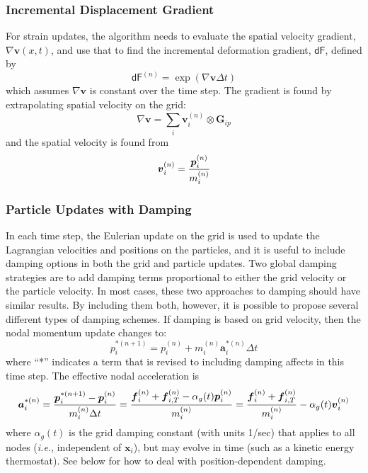 \documentclass[11pt]{article}
\renewcommand{\vec}[1]{\boldsymbol{#1}}
\newcommand{\tens}[1]{\boldsymbol{\mathsf{#1}}}
\begin{document}
\subsubsection{Incremental Displacement Gradient}

For strain updates, the algorithm needs to evaluate the spatial velocity gradient, $\nabla \vec v(x,t)$, and use that to find the incremental deformation gradient, $\tens{dF}$, defined by
\begin{equation}
     \tens{dF}^{(n)} = \exp(\nabla \vec v \Delta t)
\end{equation}
which assumes $\nabla \vec v$ is constant over the time step. The gradient is found by extrapolating spatial velocity on the grid:
\begin{equation}
    \nabla \vec v = \sum_i \vec v_i^{(n)} \otimes \vec G_{ip}
\end{equation}
and the spatial velocity is found from
\begin{equation}
      \vec  v_i^{(n)} = {\vec p_i^{(n)}\over m_i^{(n)}} 
\end{equation}

\subsubsection{Particle Updates with Damping}

In each time step, the Eulerian update on the grid is used to update the Lagrangian velocities and positions on the particles, and it is useful to include damping options in both the grid and particle updates. Two global damping strategies are to add damping terms proportional to either the grid velocity or the particle velocity. In most cases, these two approaches to damping should have similar results. By including them both, however, it is possible to propose several different types of damping schemes. If damping is based on grid velocity, then the nodal momentum update changes to:
\begin{equation}
     p_i^{*(n+1)} = p_i^{(n)} +  m_i^{(n)}\vec a_i^{*(n)}\Delta t
\end{equation}
where ``*'' indicates a term that is revised to including damping affects in this time step. The effective nodal acceleration is
\begin{equation}
    \vec a_i^{*(n)} = {\vec p_i^{*(n+1)}-\vec p_i^{(n)} \over m_i^{(n)}\Delta t}
         =  { \vec f_{i}^{(n)} + \vec f_{i,T}^{(n)} - \alpha_g(t)\vec p_i^{(n)}  \over m_i^{(n)}}
          =  { \vec f_{i}^{(n)} + \vec f_{i,T}^{(n)} \over m_i^{(n)}} -  \alpha_g(t)\vec v_i^{(n)}
\end{equation}
where $\alpha_g(t)$ is the grid damping constant (with units 1/sec) that applies to all nodes (\emph{i.e.}, independent of $\vec x_i$), but may evolve in time (such as a kinetic energy thermostat). See below for how to deal with position-dependent damping.
\end{document}
